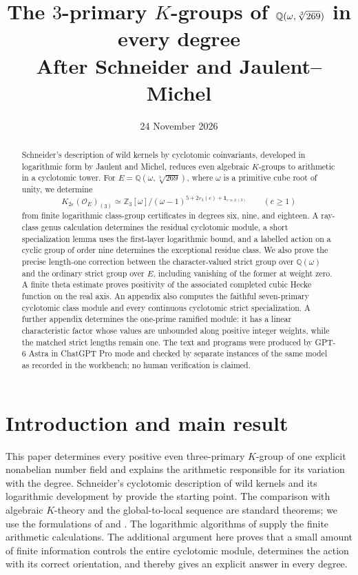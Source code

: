 \documentclass[11pt]{article}
\title{The $3$-primary $K$-groups of $\Q(\omega,\sqrt[3]{269})$ in every degree\\[3pt]
\large After Schneider and Jaulent--Michel}
\author{}
\date{24 November 2026}
\theoremstyle{remark}\newtheorem{remark}[theorem]{Remark}
\newcommand{\Z}{\mathbb Z}\newcommand{\Q}{\mathbb Q}\newcommand{\F}{\mathbb F}
\newcommand{\Oa}{\mathcal O}\newcommand{\Cl}{\operatorname{Cl}}
\newcommand{\ind}{\mathbf1}
\begin{document}
\maketitle
\begin{abstract}
Schneider's description of wild kernels by cyclotomic coinvariants, developed in logarithmic form by Jaulent and Michel, reduces even algebraic $K$-groups to arithmetic in a cyclotomic tower.
For $E=\Q(\omega,\sqrt[3]{269})$, where $\omega$ is a primitive cube root of unity, we determine
\[
 K_{2e}(\Oa_E)_{(3)}\simeq\Z_3[\omega]/(\omega-1)^{5+2v_3(e)+\ind_{e\equiv2\ (3)}}
 \qquad(e\geq1)
\]
from finite logarithmic class-group certificates in degrees six, nine, and eighteen.
A ray-class genus calculation determines the residual cyclotomic module, a short specialization lemma uses the first-layer logarithmic bound, and a labelled action on a cyclic group of order nine determines the exceptional residue class.
We also prove the precise length-one correction between the character-valued strict group over $\Q(\omega)$ and the ordinary strict group over $E$, including vanishing of the former at weight zero.
A finite theta estimate proves positivity of the associated completed cubic Hecke function on the real axis.
An appendix also computes the faithful seven-primary
cyclotomic class module and every continuous cyclotomic strict specialization.
A further appendix determines the one-prime ramified module: it has a
linear characteristic factor whose values are unbounded along positive
integer weights, while the matched strict lengths remain one.
The text and programs were produced by GPT-6 Astra in ChatGPT Pro mode and checked by separate instances of the same model as recorded in the workbench; no human verification is claimed.
\end{abstract}
\tableofcontents

\section{Introduction and main result}
This paper determines every positive even three-primary $K$-group of one explicit nonabelian number field and explains the arithmetic responsible for its variation with the degree.
Schneider's cyclotomic description of wild kernels \citep{Schneider1979} and its logarithmic development by \citet{JaulentMichel2006} provide the starting point.
The comparison with algebraic $K$-theory and the global-to-local sequence are standard theorems; we use the formulations of \citet{Weibel2013} and \citet{KolsterMovahhedi2000}.
The logarithmic algorithms of \citet{BelabasJaulent2016} supply the finite arithmetic calculations.
The additional argument here proves that a small amount of finite information controls the entire cyclotomic module, determines the action with its correct orientation, and thereby gives an explicit answer in every degree.
\end{document}
